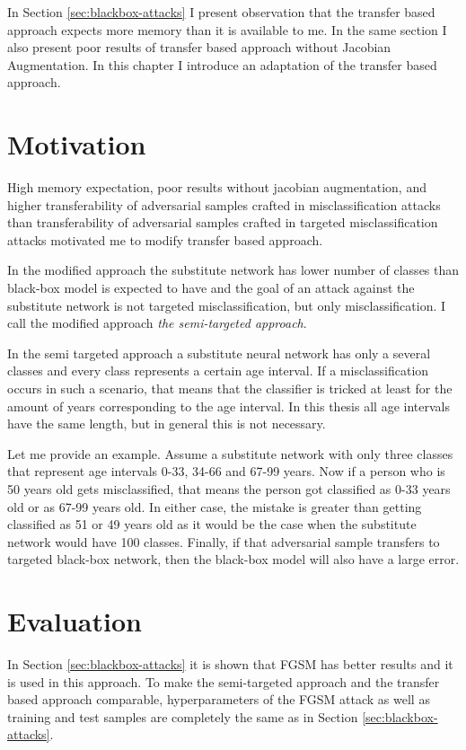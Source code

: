 In Section \ref{sec:blackbox-attacks} I present observation that the transfer based approach expects more memory than it is available to me. In the same section I also present poor results of transfer based approach without Jacobian Augmentation. In this chapter I introduce an adaptation of the transfer based approach.

\section{Motivation}
High memory expectation, poor results without jacobian augmentation, and higher transferability of adversarial samples crafted in misclassification attacks than transferability of adversarial samples crafted in targeted misclassification attacks \cite{ensemble-attack} motivated me to modify transfer based approach.

In the modified approach the substitute network has lower number of classes than black-box model is expected to have and the goal of an attack against the substitute network is not targeted misclassification, but only misclassification. I call the modified approach \textit{the semi-targeted approach}.

In the semi targeted approach a substitute neural network has only a several classes and every class represents a certain age interval. If a misclassification occurs in such a scenario, that means that the classifier is tricked at least for the amount of years corresponding to the age interval. In this thesis all age intervals have the same length, but in general this is not necessary.

Let me provide an example. Assume a substitute network with only three classes that represent age intervals 0-33, 34-66 and 67-99 years. Now if a person who is 50 years old gets misclassified, that means the person got classified as 0-33 years old or as 67-99 years old. In either case, the mistake is greater than getting classified as 51 or 49 years old as it would be the case when the substitute network would have 100 classes. Finally, if that adversarial sample transfers to targeted black-box network, then the black-box model will also have a large error.

\section{Evaluation}
In Section \ref{sec:blackbox-attacks} it is shown that FGSM has better results and it is used in this approach. To make the semi-targeted approach and the transfer based approach comparable, hyperparameters of the FGSM attack as well as training and test samples are completely the same as in Section \ref{sec:blackbox-attacks}. 

